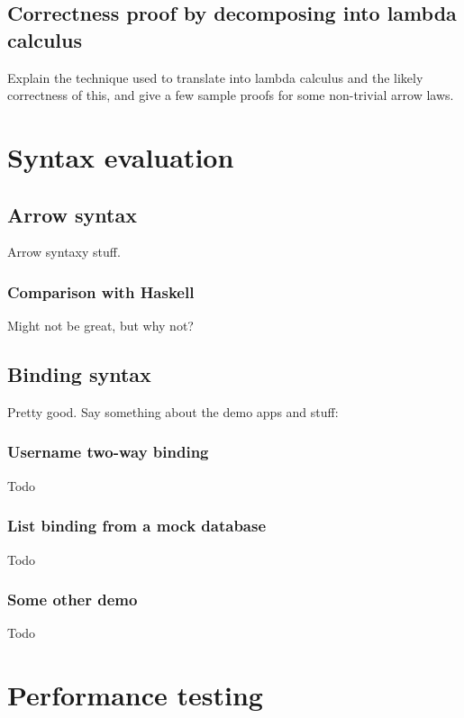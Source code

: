 \documentclass[12pt,twoside,notitlepage]{report}
\begin{document}
\subsection{Correctness proof by decomposing into lambda calculus}

Explain the technique used to translate into lambda calculus and the likely correctness of this, and give a few sample proofs for some non-trivial arrow laws.

\section{Syntax evaluation}

\subsection{Arrow syntax}

Arrow syntaxy stuff.

\subsubsection{Comparison with Haskell}

Might not be great, but why not?

\subsection{Binding syntax}

Pretty good. Say something about the demo apps and stuff:

\subsubsection{Username two-way binding}

Todo

\subsubsection{List binding from a mock database}

Todo

\subsubsection{Some other demo}

Todo

\section{Performance testing}
\end{document}
